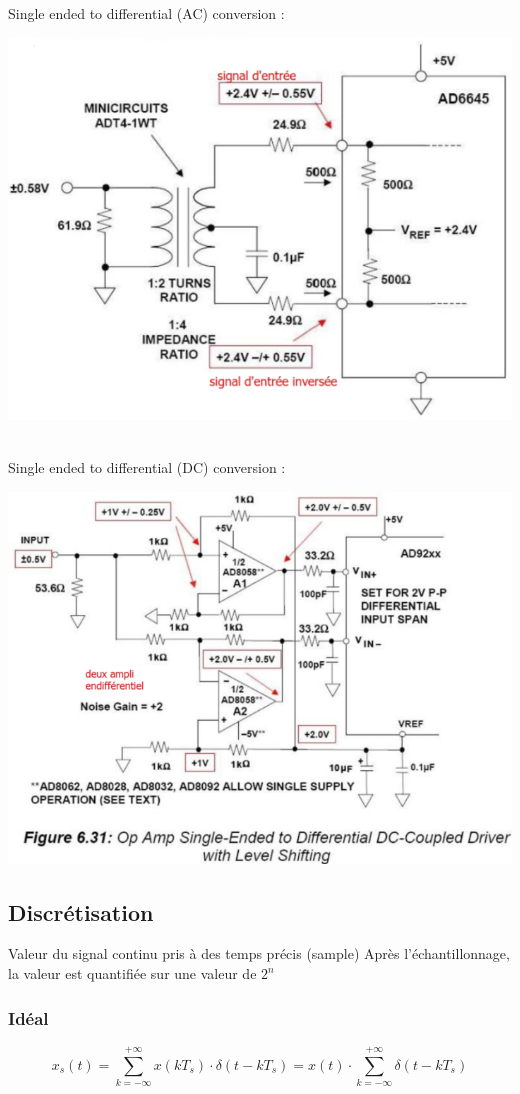 \documentclass[resume]{subfiles}
\begin{document}
\begin{multicols}{3}
\begin{minipage}{\linewidth}
\end{minipage}\\
Single ended to differential (AC) conversion :\\
\begin{minipage}{\linewidth}
	\centering
    \includegraphics[width =0.7\columnwidth]{an15.png}
\end{minipage}\\
Single ended to differential (DC) conversion :\\
\begin{center}
	\centering
    \includegraphics[width =0.7\columnwidth]{an16.png}
\end{center}
\subsection{Discrétisation}
Valeur du signal continu pris à des temps précis (sample)
Après l'échantillonnage, la valeur est quantifiée sur une valeur de $2^n$
\subsubsection{Idéal}
\begin{equation}
x_s(t) = \sum^{+\infty}_{k=-\infty} x(kT_s)\cdot \delta(t-kT_s) = x(t)\cdot \sum^{+\infty}_{k=-\infty} \delta(t-kT_s)
\end{equation}

\end{multicols}
\end{document}
